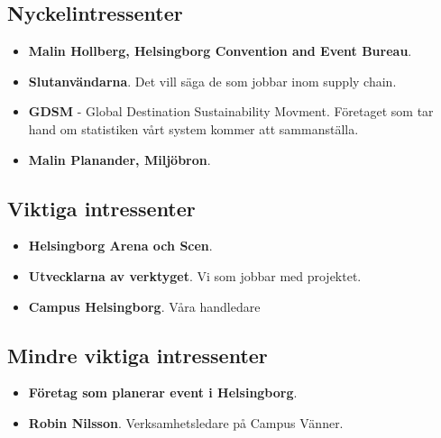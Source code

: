 \documentclass{article}
\begin{document}
    \subsection{Nyckelintressenter}
        \begin{itemize}
            \item \textbf{Malin Hollberg, Helsingborg Convention and Event Bureau}.
                \\
            \item \textbf{Slutanvändarna}. Det vill säga de som jobbar inom supply chain.
                \\
            \item \textbf{GDSM} - Global Destination Sustainability Movment. Företaget som tar hand om statistiken vårt system kommer att sammanställa.
             \\
            \item \textbf{Malin Planander, Miljöbron}.
        \end{itemize}
        
    \subsection{Viktiga intressenter}
        \begin{itemize}
            \item \textbf{Helsingborg Arena och Scen}.
            \\
            \item \textbf{Utvecklarna av verktyget}. Vi som jobbar med projektet.
                \\
            \item \textbf{Campus Helsingborg}. Våra handledare
        \end{itemize}
        
    \subsection{Mindre viktiga intressenter}
    \begin{itemize}
            \item \textbf{Företag som planerar event i Helsingborg}.
                \\
            \item \textbf{Robin Nilsson}. Verksamhetsledare på Campus Vänner.
            
    \end{itemize}
    
\end{document}
